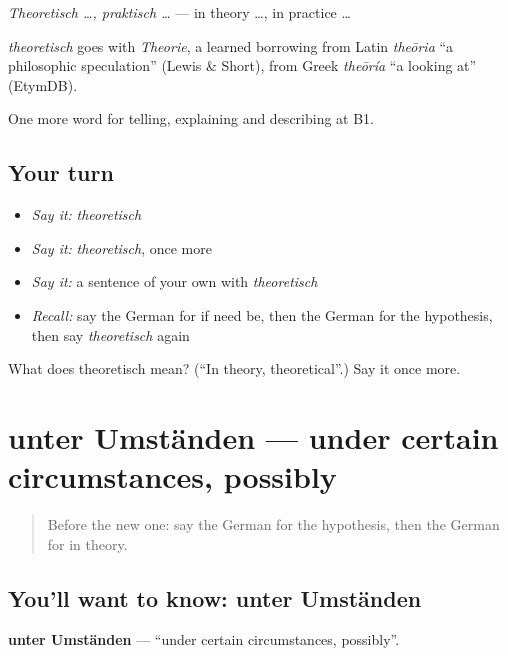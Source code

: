 \emph{Theoretisch …, praktisch …} — in theory …, in practice …

\begin{cousinweb}
\emph{theoretisch} goes with \emph{Theorie}, a learned borrowing from Latin \emph{theōria} \textquotedblleft{}a philosophic speculation\textquotedblright{} (Lewis \& Short), from Greek \emph{theōría} \textquotedblleft{}a looking at\textquotedblright{} (EtymDB).
\end{cousinweb}

\begin{grammarlens}[title={What you've built}]
One more word for telling, explaining and describing at B1.
\end{grammarlens}

\subsection*{Your turn}
\begin{itemize}
\raggedright
  \item \emph{Say it:} \emph{theoretisch}
  \item \emph{Say it:} \emph{theoretisch}, once more
  \item \emph{Say it:} a sentence of your own with \emph{theoretisch}
  \item \emph{Recall:} say the German for if need be, then the German for the hypothesis, then say \emph{theoretisch} again
\end{itemize}

\begin{tcolorbox}[breakable,colback=teal!4,colframe=teal!35!black,title={Before you move on}]
What does theoretisch mean? (\textquotedblleft{}In theory, theoretical\textquotedblright{}.) Say it once more.
\end{tcolorbox}
\section[unter Umständen]{unter Umständen — under certain circumstances, possibly}

\label{lesson:GE-C366-unter-umstaenden}



\begin{quote}
Before the new one: say the German for the hypothesis, then the German for in theory.
\end{quote}

\subsection*{You'll want to know: unter Umständen}
\textbf{unter Umständen} — \textquotedblleft{}under certain circumstances, possibly\textquotedblright{}.

